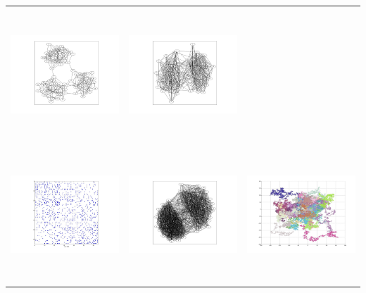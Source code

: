 \begin{tabular}{ |c|c|c| }
\includegraphics[width=5.0cm,height=5.0cm]{images/RandomGraph_With3Cuts_90_nodes_pii_25_pij_06_MinimizedAdjacency_PerronFrobenius.jpg} &
\includegraphics[width=5.0cm,height=5.0cm]{images/RandomGraph_WithCut_64Nodes.jpg}                                                      \\
\includegraphics[width=5.0cm,height=5.0cm]{images/RandomGraph_WithCut_adjacencyMatrix_64Nodes.jpg}               &
\includegraphics[width=5.0cm,height=5.0cm]{images/RandomGraph_WithCut_jpg.jpg}                                    &
\includegraphics[width=5.0cm,height=5.0cm]{images/RandomWalk_30_Walkers_20000_steps.jpg}                           \\

\end{tabular}
